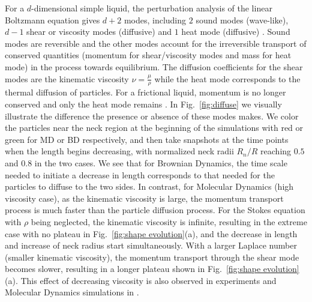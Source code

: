 \documentclass[%
reprint,
amsmath,amssymb,
aps,
]{revtex4-2}
\begin{document}
	For a $d$-dimensional simple liquid, the perturbation analysis of the linear Boltzmann equation gives $d+2$ modes, including $2$ sound modes (wave-like), $d-1$ shear or viscosity modes (diffusive) and $1$ heat mode (diffusive) \cite{soto2016kinetic,dorfman2021contemporary}. Sound modes are reversible and the other modes account for the irreversible transport of conserved quantities (momentum for shear/viscosity modes and mass for heat mode) in the process towards equilibrium. The diffusion coefficients for the shear modes are the kinematic viscosity $\nu = \frac{\mu}{\rho}$ while the heat mode corresponds to the thermal diffusion of particles. For a frictional liquid, momentum is no longer conserved and only the heat mode remains \cite{hessGeneralizedHydrodynamicsSystems1983}. In Fig.~\ref{fig:diffuse} we visually illustrate the difference the presence or absence of these modes makes. We color the particles near the neck region at the beginning of the simulations with red or green for MD or BD respectively, and then take snapshots at the time points when the length begins decreasing, with normalized neck radii $R_n/R$ reaching $0.5$ and $0.8$ in the two cases. We see that for Brownian Dynamics, the time scale needed to initiate a decrease in length corresponds to that needed for the particles to diffuse to the two sides. In contrast, for Molecular Dynamics (high viscosity case), as the kinematic viscosity is large, the momentum transport process is much faster than the particle diffusion process. For the Stokes equation with $\rho$ being neglected, the kinematic viscosity is infinite, resulting in the extreme case with no plateau in Fig.~\ref{fig:shape evolution}(a), and the decrease in length and increase of neck radius start simultaneously. With a larger Laplace number (smaller kinematic viscosity), the momentum transport through the shear mode becomes slower, resulting in a longer plateau shown in Fig.~\ref{fig:shape evolution}(a). This effect of decreasing viscosity is also observed in experiments \cite{paulsenInexorableResistanceInertia2012a} and Molecular Dynamics simulations in \cite{heinenDropletCoalescenceMolecular2022a}.  
	
\end{document}
